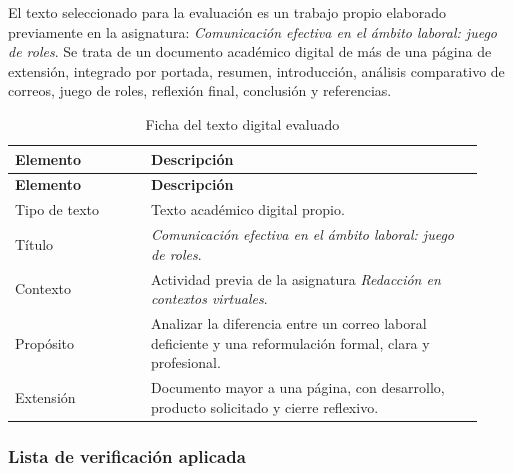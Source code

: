 El texto seleccionado para la evaluación es un trabajo propio elaborado previamente en la asignatura: \textit{Comunicación efectiva en el ámbito laboral: juego de roles}. Se trata de un documento académico digital de más de una página de extensión, integrado por portada, resumen, introducción, análisis comparativo de correos, juego de roles, reflexión final, conclusión y referencias.

\begingroup
\small
\setlength{\tabcolsep}{6pt}
\renewcommand{\arraystretch}{1.28}
\begin{longtable}{@{}p{0.27\linewidth}p{0.66\linewidth}@{}}
\caption{Ficha del texto digital evaluado}\label{tab:ficha-texto}\\
\toprule
\textbf{Elemento} & \textbf{Descripción} \\
\midrule
\endfirsthead
\toprule
\textbf{Elemento} & \textbf{Descripción} \\
\midrule
\endhead
Tipo de texto & Texto académico digital propio. \\
\addlinespace
Título & \textit{Comunicación efectiva en el ámbito laboral: juego de roles}. \\
\addlinespace
Contexto & Actividad previa de la asignatura \textit{Redacción en contextos virtuales}. \\
\addlinespace
Propósito & Analizar la diferencia entre un correo laboral deficiente y una reformulación formal, clara y profesional. \\
\addlinespace
Extensión & Documento mayor a una página, con desarrollo, producto solicitado y cierre reflexivo. \\
\bottomrule
\end{longtable}
\endgroup

\subsubsection{Lista de verificación aplicada}


